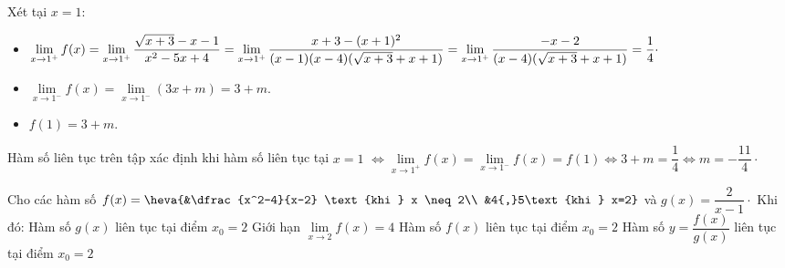 \begin{ex}
{\begin{itemchoice}
		 Xét tại $x=1$:
		\begin{itemize}
			\item $\lim\limits_{x \to 1^{+}} f(x)=\lim\limits_{x  \to 1^{+}} \dfrac{\sqrt{x+3}-x-1}{x^2-5x+4}=\lim\limits_{x \to 1^{+}} \dfrac{x+3-(x+1)^2}{(x-1)(x-4)(\sqrt{x+3}+x+1)}\\=\lim\limits_{x \to 1^{+}} \dfrac{-x-2}{(x-4)(\sqrt{x+3}+x+1)}=\dfrac{1}{4}\cdot$
			\item  $\lim\limits_{x \to 1^{-}} f(x)=\lim\limits_{x \to 1^{-}}(3x+m)=3+m$.
			 \item $f(1)=3+m$.
		\end{itemize}
		Hàm số liên tục trên tập xác định khi hàm số liên tục  tại $x=1$
		$\Leftrightarrow  \lim\limits_{x \to 1^{+}} f(x)=\lim\limits_{x \to 1^{-}} f(x)=f(1) \Leftrightarrow 3+m=\dfrac{1}{4} \Leftrightarrow m=-\dfrac{11}{4}\cdot$
	\end{itemchoice}
 }
\end{ex}

\begin{ex}%
	[Dự án 11HVA 2024-2025] 
	Cho các hàm số $f(x)=\heva{&\dfrac{x^2-4}{x-2} \text{khi }  x \neq 2\\
	&4{,}5\text{khi  } x=2}$ và $g(x)=\dfrac{2}{x-1}\cdot$ Khi đó:
	 \choiceTF
		{\True Hàm số $g(x)$ liên tục  tại điểm $x_0=2$}
		{\True Giới hạn $\lim\limits_{x \to 2} f(x)=4$} 
		{Hàm số $f(x)$ liên  tục tại điểm $x_0=2$}
		{Hàm  số $y=\dfrac{f(x)}{g(x)}$ liên tục tại điểm $x_0=2$}
\end{ex}

